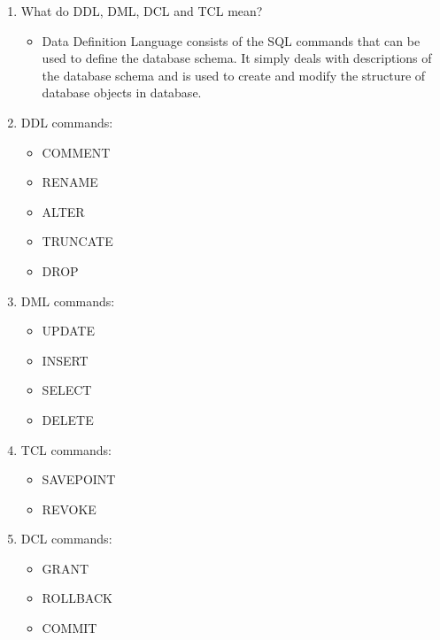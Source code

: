 \documentclass[12pt]{article}
\begin{document}
\begin{enumerate}
\begin{itemize}
                \end{itemize}
                \item What do DDL, DML, DCL and TCL mean?
                \begin{itemize}
                \item  Data Definition Language consists of the SQL commands that can be used to define the database schema. It simply deals with descriptions of the database schema and is used to create and modify the structure of database objects in database.
                \end{itemize}
                \item  DDL commands:
                \begin{itemize}                 
                        \item COMMENT 
                        \item RENAME 
                        \item ALTER 
                        \item TRUNCATE 
                        \item DROP 
                \end{itemize}
                \item  DML commands:
                \begin{itemize}                 
                        \item UPDATE  
                        \item INSERT  
                        \item SELECT  
                        \item DELETE  
                \end{itemize}
                \item  TCL  commands:
                \begin{itemize}                 
                        \item SAVEPOINT    
                        \item REVOKE     
                \end{itemize}
                \item  DCL   commands:   
                \begin{itemize}                 
                        \item GRANT    
                        \item ROLLBACK   
                        \item COMMIT    

\end{itemize}
\end{enumerate}
\end{document}
